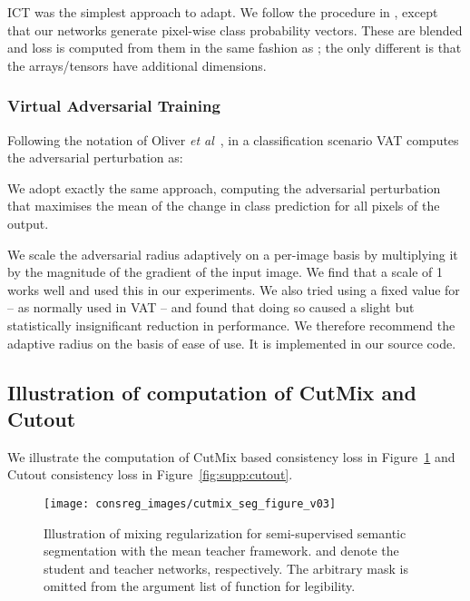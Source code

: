 \documentclass{bmvc2k}
\def\etal{\emph{et al}\bmvaOneDot}
\begin{document}
ICT was the simplest approach to adapt. We follow the procedure in \cite{Verma:ICT}, except that our networks generate pixel-wise class probability vectors.
These are blended and loss is computed from them in the same fashion as \cite{Verma:ICT}; the only different is that the arrays/tensors have additional dimensions.


\subsubsection{Virtual Adversarial Training}

Following the notation of Oliver \etal~\cite{Oliver:RealisticEval}, in a classification scenario VAT computes the adversarial perturbation  as:








We adopt exactly the same approach, computing the adversarial perturbation that maximises the mean of the change in class prediction for all pixels of the output.

We scale the adversarial radius  adaptively on a per-image basis by multiplying it by the magnitude of the gradient of the input image.
We find that a scale of 1 works well and used this in our experiments.
We also tried using a fixed value for  -- as normally used in VAT -- and found that doing so caused a slight but statistically insignificant reduction in performance.
We therefore recommend the adaptive radius on the basis of ease of use. It is implemented in our source code.



\subsection{Illustration of computation of CutMix and Cutout}
\label{app:seg:cutmix_illus}

We illustrate the computation of CutMix based consistency loss  in Figure~\ref{fig:supp:cutmix} and Cutout consistency loss in Figure~\ref{fig:supp:cutout}.

\begin{figure}[t]
\centering
\texttt{[image: consreg\_images/cutmix\_seg\_figure\_v03]}
\caption{\label{fig:supp:cutmix}Illustration of mixing regularization for semi-supervised semantic segmentation with the mean teacher framework.
 and  denote the student and teacher networks, respectively. The arbitrary
mask  is omitted from the argument list of function  for legibility.
}
\end{figure}
\end{document}

